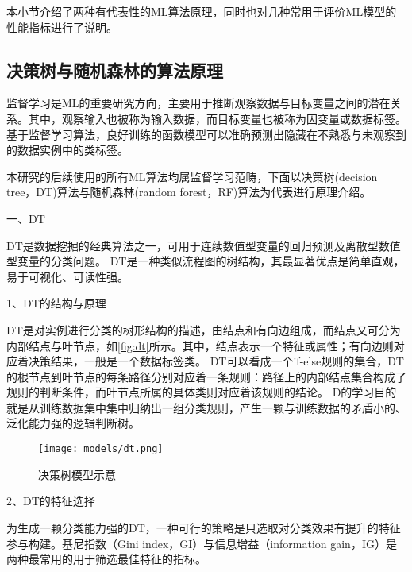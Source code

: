 本小节介绍了两种有代表性的ML算法原理，同时也对几种常用于评价ML模型的性能指标进行了说明。

\subsection{决策树与随机森林的算法原理}
监督学习是ML的重要研究方向，主要用于推断观察数据与目标变量之间的潜在关系。其中，观察输入也被称为输入数据，而目标变量也被称为因变量或数据标签。
基于监督学习算法，良好训练的函数模型可以准确预测出隐藏在不熟悉与未观察到的数据实例中的类标签。

本研究的后续使用的所有ML算法均属监督学习范畴，下面以决策树(decision tree，DT)算法与随机森林(random forest，RF)算法为代表进行原理介绍。

一、DT

DT是数据挖掘的经典算法之一，可用于连续数值型变量的回归预测及离散型数值型变量的分类问题\cite{Li2017,Liu2018}。
DT是一种类似流程图的树结构，其最显著优点是简单直观，易于可视化、可读性强。

1、DT的结构与原理

DT是对实例进行分类的树形结构的描述，由结点和有向边组成，而结点又可分为内部结点与叶节点，如\autoref{fig:dt}所示。其中，结点表示一个特征或属性；有向边则对应着决策结果，一般是一个数据标签类\cite{Li2017,Zhou2016}。
DT可以看成一个if-else规则的集合，DT的根节点到叶节点的每条路径分别对应着一条规则：路径上的内部结点集合构成了规则的判断条件，而叶节点所属的具体类则对应着该规则的结论。
D的学习目的就是从训练数据集中集中归纳出一组分类规则，产生一颗与训练数据的矛盾小的、泛化能力强的逻辑判断树。
\begin{figure}[htbp]
      \centering
      \texttt{[image: models/dt.png]}
      \caption{\label{fig:dt}决策树模型示意}
\end{figure}

2、DT的特征选择

为生成一颗分类能力强的DT，一种可行的策略是只选取对分类效果有提升的特征参与构建。基尼指数（Gini index，GI）与信息增益（information gain，IG）是两种最常用的用于筛选最佳特征的指标。

